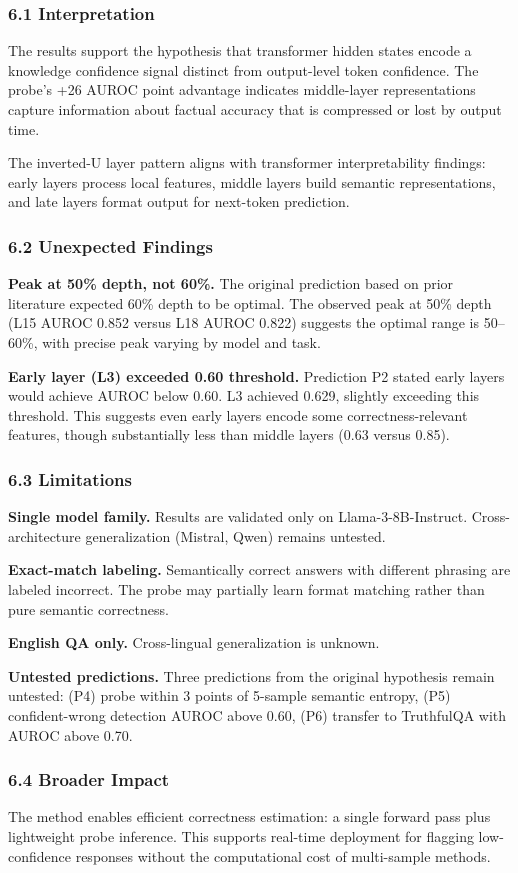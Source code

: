 
\subsubsection{6.1 Interpretation}

The results support the hypothesis that transformer hidden states encode a knowledge confidence signal distinct from output-level token confidence. The probe's +26 AUROC point advantage indicates middle-layer representations capture information about factual accuracy that is compressed or lost by output time.

The inverted-U layer pattern aligns with transformer interpretability findings: early layers process local features, middle layers build semantic representations, and late layers format output for next-token prediction.

\subsubsection{6.2 Unexpected Findings}

\textbf{Peak at 50\% depth, not 60\%.} The original prediction based on prior literature expected 60\% depth to be optimal. The observed peak at 50\% depth (L15 AUROC 0.852 versus L18 AUROC 0.822) suggests the optimal range is 50--60\%, with precise peak varying by model and task.

\textbf{Early layer (L3) exceeded 0.60 threshold.} Prediction P2 stated early layers would achieve AUROC below 0.60. L3 achieved 0.629, slightly exceeding this threshold. This suggests even early layers encode some correctness-relevant features, though substantially less than middle layers (0.63 versus 0.85).

\subsubsection{6.3 Limitations}

\textbf{Single model family.} Results are validated only on Llama-3-8B-Instruct. Cross-architecture generalization (Mistral, Qwen) remains untested.

\textbf{Exact-match labeling.} Semantically correct answers with different phrasing are labeled incorrect. The probe may partially learn format matching rather than pure semantic correctness.

\textbf{English QA only.} Cross-lingual generalization is unknown.

\textbf{Untested predictions.} Three predictions from the original hypothesis remain untested: (P4) probe within 3 points of 5-sample semantic entropy, (P5) confident-wrong detection AUROC above 0.60, (P6) transfer to TruthfulQA with AUROC above 0.70.

\subsubsection{6.4 Broader Impact}

The method enables efficient correctness estimation: a single forward pass plus lightweight probe inference. This supports real-time deployment for flagging low-confidence responses without the computational cost of multi-sample methods.

